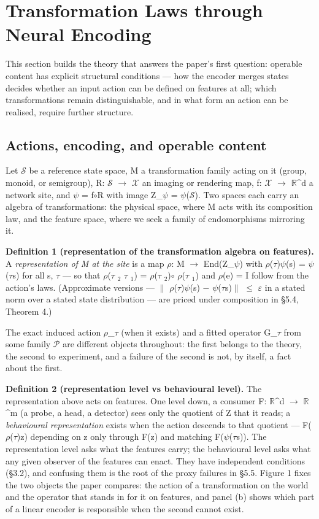 \section{Transformation Laws through Neural Encoding}

This section builds the theory that answers the paper's first question: operable content has explicit structural conditions --- how the encoder merges states decides whether an input action can be defined on features at all; which transformations remain distinguishable, and in what form an action can be realised, require further structure.

\subsection{Actions, encoding, and operable content}

Let $\mathcal{S}$ be a reference state space, M a transformation family acting on it (group, monoid, or semigroup), R: $\mathcal{S}$ $\to$ $\mathcal{X}$ an imaging or rendering map, f: $\mathcal{X}$ $\to$ $\mathbb{R}$\textasciicircum{}d a network site, and $\psi$ = f$\circ$R with image Z\_$\psi$ = $\psi$($\mathcal{S}$). Two spaces each carry an algebra of transformations: the physical space, where M acts with its composition law, and the feature space, where we seek a family of endomorphisms mirroring it.

\textbf{Definition 1 (representation of the transformation algebra on features).} A \textit{representation of M at the site} is a map $\rho$: M $\to$ End(Z\_$\psi$) with $\rho$($\tau$)$\psi$(s) = $\psi$($\tau$s) for all s, $\tau$ --- so that $\rho$($\tau$ $_2$ $\tau$ $_1$) = $\rho$($\tau$ $_2$)$\circ$ $\rho$($\tau$ $_1$) and $\rho$(e) = I follow from the action's laws. (Approximate versions --- $\|$ $\rho$($\tau$)$\psi$(s) $-$ $\psi$($\tau$s)$\|$ $\le$ $\varepsilon$ in a stated norm over a stated state distribution --- are priced under composition in \S{}5.4, Theorem 4.)

The exact induced action $\rho$\_$\tau$ (when it exists) and a fitted operator G\_$\tau$ from some family $\mathcal{P}$ are different objects throughout: the first belongs to the theory, the second to experiment, and a failure of the second is not, by itself, a fact about the first.

\textbf{Definition 2 (representation level vs behavioural level).} The representation above acts on features. One level down, a consumer F: $\mathbb{R}$\textasciicircum{}d $\to$ $\mathbb{R}$\textasciicircum{}m (a probe, a head, a detector) sees only the quotient of Z that it reads; a \textit{behavioural representation} exists when the action descends to that quotient --- F($\rho$($\tau$)z) depending on z only through F(z) and matching F($\psi$($\tau$s)). The representation level asks what the features carry; the behavioural level asks what any given observer of the features can enact. They have independent conditions (\S{}3.2), and confusing them is the root of the proxy failures in \S{}5.5. Figure 1 fixes the two objects the paper compares: the action of a transformation on the world and the operator that stands in for it on features, and panel (b) shows which part of a linear encoder is responsible when the second cannot exist.

